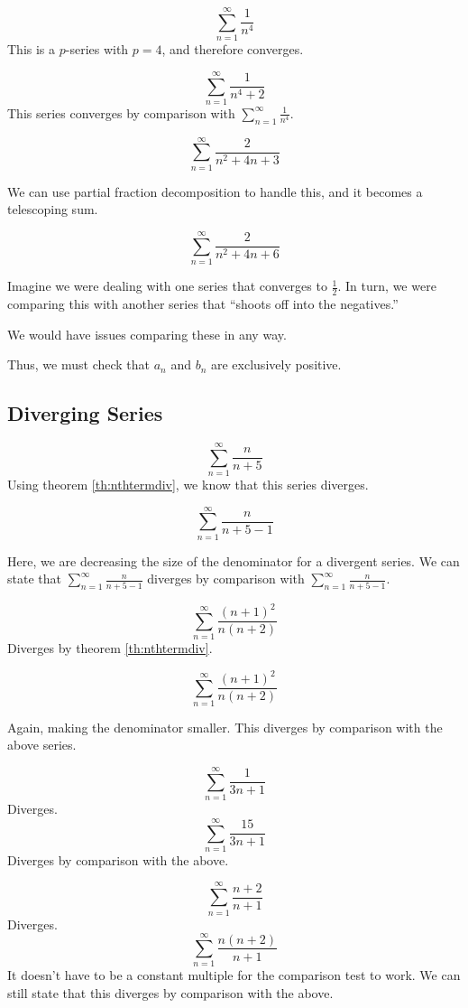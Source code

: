 \begin{ex}
  \[ \sum_{n=1}^{\infty} \frac{1}{n^4} \]
  This is a $p$-series with $p=4$, and therefore converges.

  \[ \sum_{n=1}^{\infty} \frac{1}{n^4+2} \]
  This series converges by comparison with $\sum_{n=1}^\infty \frac{1}{n^4}$.
\end{ex}
\begin{ex}
  \[ \sum_{n=1}^{\infty} \frac{2}{n^2+4n+3} \]
  \begin{note}
    We can use partial fraction decomposition to handle this, and it becomes a telescoping sum.
  \end{note}

  \[ \sum_{n=1}^{\infty} \frac{2}{n^2+4n+6} \]
\end{ex}

\begin{remark}
  Imagine we were dealing with one series that converges to \( \frac{1}{2} \).
  In turn, we were comparing this with another series that ``shoots off into the negatives.''

  We would have issues comparing these in any way.

  Thus, we must check that \(a_n\) and \(b_n\) are exclusively positive.
\end{remark}

\subsection{Diverging Series}
\begin{ex}
  \[ \sum_{n=1}^{\infty} \frac{n}{n+5} \]
  Using theorem \ref{th:nthtermdiv}, we know that this series diverges.

  \[ \sum_{n=1}^{\infty} \frac{n}{n+5-1} \]

  Here, we are decreasing the size of the denominator for a divergent series.
  We can state that \( \sum_{n=1}^{\infty} \frac{n}{n+5-1} \) diverges by comparison with \( \sum_{n=1}^{\infty} \frac{n}{n+5-1} \).
\end{ex}
\begin{ex}
  \[ \sum_{n=1}^{\infty} \frac{(n+1)^2}{n(n+2)} \]
  Diverges by theorem \ref{th:nthtermdiv}.

  \[ \sum_{n=1}^{\infty} \frac{(n+1)^2}{n(n+2)} \]

  Again, making the denominator smaller. This diverges by comparison with the above series.
\end{ex}
\begin{ex}
  \[ \sum_{n=1}^{\infty} \frac{1}{3n+1} \]
  Diverges.
  \[ \sum_{n=1}^{\infty} \frac{15}{3n+1} \]
  Diverges by comparison with the above.
\end{ex}
\begin{ex}
  \[ \sum_{n=1}^{\infty} \frac{n+2}{n+1} \]
  Diverges.
  \[ \sum_{n=1}^{\infty} \frac{n(n+2)}{n+1} \]
  It doesn't have to be a constant multiple for the comparison test to work.
  We can still state that this diverges by comparison with the above.
\end{ex}

